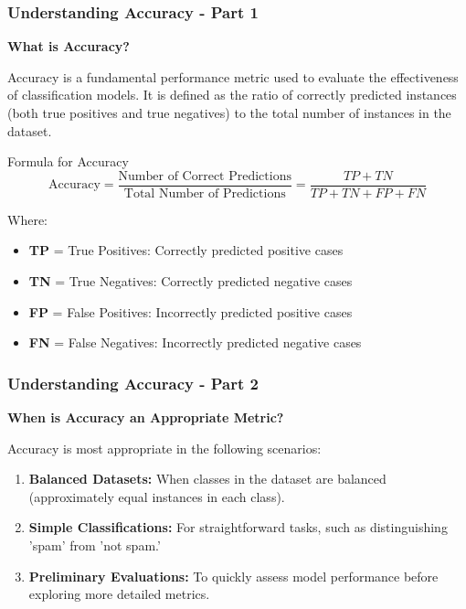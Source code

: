 \documentclass[aspectratio=169]{beamer}
\begin{document}
\begin{frame}[fragile]
    \frametitle{Understanding Accuracy - Part 1}
    \textbf{What is Accuracy?}
    
    Accuracy is a fundamental performance metric used to evaluate the effectiveness of classification models. It is defined as the ratio of correctly predicted instances (both true positives and true negatives) to the total number of instances in the dataset.
    
    \begin{block}{Formula for Accuracy}
    \begin{equation}
    \text{Accuracy} = \frac{\text{Number of Correct Predictions}}{\text{Total Number of Predictions}} = \frac{TP + TN}{TP + TN + FP + FN}
    \end{equation}
    \end{block}
    
    Where:
    \begin{itemize}
        \item \textbf{TP} = True Positives: Correctly predicted positive cases
        \item \textbf{TN} = True Negatives: Correctly predicted negative cases
        \item \textbf{FP} = False Positives: Incorrectly predicted positive cases
        \item \textbf{FN} = False Negatives: Incorrectly predicted negative cases
    \end{itemize}
\end{frame}

\begin{frame}[fragile]
    \frametitle{Understanding Accuracy - Part 2}
    \textbf{When is Accuracy an Appropriate Metric?}

    Accuracy is most appropriate in the following scenarios:

    \begin{enumerate}
        \item \textbf{Balanced Datasets:} When classes in the dataset are balanced (approximately equal instances in each class).
        \item \textbf{Simple Classifications:} For straightforward tasks, such as distinguishing 'spam' from 'not spam.'
        \item \textbf{Preliminary Evaluations:} To quickly assess model performance before exploring more detailed metrics.
    \end{enumerate}
\end{frame}
\end{document}

